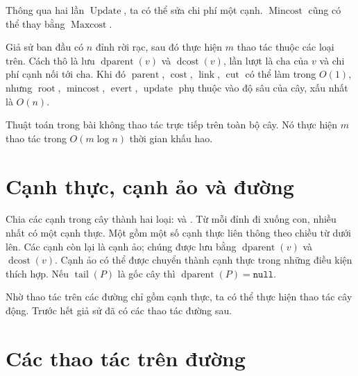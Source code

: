 \documentclass[11pt]{article}
\begin{document}
Thông qua hai lần \(\operatorname{Update}\), ta có thể sửa chi phí một cạnh.
\(\operatorname{Mincost}\) cũng có thể thay bằng \(\operatorname{Maxcost}\).

Giả sử ban đầu có \(n\) đỉnh rời rạc, sau đó thực hiện \(m\) thao tác thuộc
các loại trên. Cách thô là lưu \(\operatorname{dparent}(v)\) và
\(\operatorname{dcost}(v)\), lần lượt là cha của \(v\) và chi phí cạnh nối tới
cha. Khi đó \(\operatorname{parent}\), \(\operatorname{cost}\),
\(\operatorname{link}\), \(\operatorname{cut}\) có thể làm trong \(O(1)\),
nhưng \(\operatorname{root}\), \(\operatorname{mincost}\),
\(\operatorname{evert}\), \(\operatorname{update}\) phụ thuộc vào độ sâu của
cây, xấu nhất là \(O(n)\).

Thuật toán trong bài không thao tác trực tiếp trên toàn bộ cây. Nó thực hiện
\(m\) thao tác trong \(O(m\log n)\) thời gian khấu hao.

\section{Cạnh thực, cạnh ảo và đường}

Chia các cạnh trong cây thành hai loại:  và .
Từ mỗi đỉnh đi xuống con, nhiều nhất có một cạnh thực. Một  gồm
một số cạnh thực liên thông theo chiều từ dưới lên. Các cạnh còn lại là cạnh
ảo; chúng được lưu bằng \(\operatorname{dparent}(v)\) và
\(\operatorname{dcost}(v)\). Cạnh ảo có thể được chuyển thành cạnh thực trong
những điều kiện thích hợp. Nếu \(\operatorname{tail}(P)\) là gốc cây thì
\(\operatorname{dparent}(P)=\texttt{null}\).

Nhờ thao tác trên các đường chỉ gồm cạnh thực, ta có thể thực hiện thao tác
cây động. Trước hết giả sử đã có các thao tác đường sau.

\section{Các thao tác trên đường}
\end{document}
